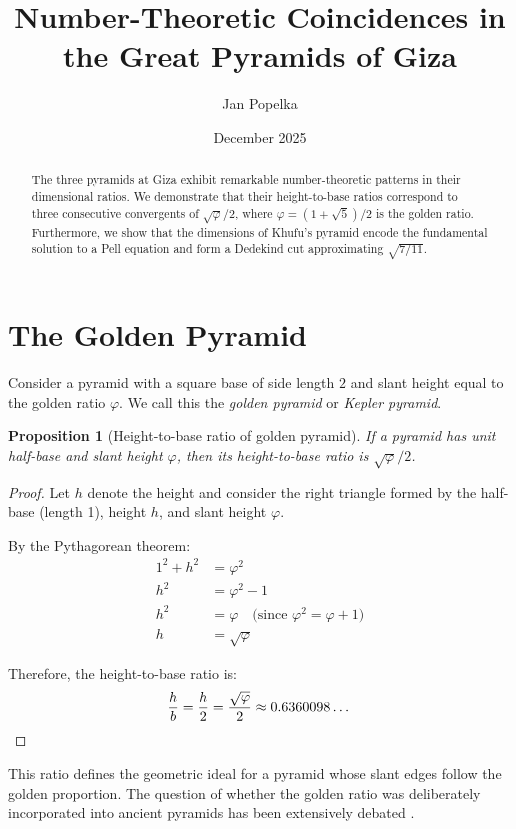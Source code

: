 \documentclass[11pt]{article}
\title{Number-Theoretic Coincidences in the Great Pyramids of Giza}
\author{Jan Popelka}
\date{December 2025}
\newtheorem{proposition}[theorem]{Proposition}
\theoremstyle{definition}
\theoremstyle{remark}
\begin{document}
\maketitle

\begin{abstract}
The three pyramids at Giza exhibit remarkable number-theoretic patterns in their dimensional ratios. We demonstrate that their height-to-base ratios correspond to three consecutive convergents of $\sqrt{\varphi}/2$, where $\varphi = (1+\sqrt{5})/2$ is the golden ratio. Furthermore, we show that the dimensions of Khufu's pyramid encode the fundamental solution to a Pell equation and form a Dedekind cut approximating $\sqrt{7/11}$.
\end{abstract}

\section{The Golden Pyramid}

Consider a pyramid with a square base of side length $2$ and slant height equal to the golden ratio $\varphi$. We call this the \emph{golden pyramid} or \emph{Kepler pyramid}.

\begin{proposition}[Height-to-base ratio of golden pyramid]
If a pyramid has unit half-base and slant height $\varphi$, then its height-to-base ratio is $\sqrt{\varphi}/2$.
\end{proposition}

\begin{proof}
Let $h$ denote the height and consider the right triangle formed by the half-base (length 1), height $h$, and slant height $\varphi$.

By the Pythagorean theorem:
\begin{align*}
1^2 + h^2 &= \varphi^2 \\
h^2 &= \varphi^2 - 1 \\
h^2 &= \varphi \quad \text{(since $\varphi^2 = \varphi + 1$)} \\
h &= \sqrt{\varphi}
\end{align*}

Therefore, the height-to-base ratio is:
\[
\frac{h}{b} = \frac{h}{2} = \frac{\sqrt{\varphi}}{2} \approx 0.6360098\ldots \qedhere
\]
\end{proof}

This ratio defines the geometric ideal for a pyramid whose slant edges follow the golden proportion. The question of whether the golden ratio was deliberately incorporated into ancient pyramids has been extensively debated \cite{livio2002}.
\end{document}
